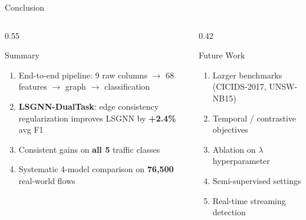 \documentclass[aspectratio=169, 10pt]{beamer}
\begin{document}
\begin{frame}{Conclusion}
\begin{columns}[T]
\begin{column}{0.55\textwidth}
\begin{block}{Summary}
\begin{enumerate}
    \item End-to-end pipeline: 9 raw columns $\to$ 68 features $\to$ graph $\to$ classification
    \item \textbf{LSGNN-DualTask}: edge consistency regularization improves LSGNN by \textbf{+2.4\%} avg F1
    \item Consistent gains on \textbf{all 5} traffic classes
    \item Systematic 4-model comparison on \textbf{76{,}500} real-world flows
\end{enumerate}
\end{block}
\end{column}
\begin{column}{0.42\textwidth}
\begin{block}{Future Work}
\begin{enumerate}
    \item Larger benchmarks (CICIDS-2017, UNSW-NB15)
    \item Temporal / contrastive objectives
    \item Ablation on $\lambda$ hyperparameter
    \item Semi-supervised settings
    \item Real-time streaming detection
\end{enumerate}
\end{block}
\end{column}
\end{columns}

\vspace{0.6cm}
\begin{center}
\end{center}
\end{frame}
\end{document}
